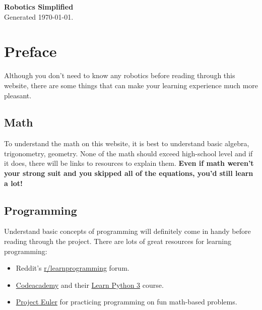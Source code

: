\documentclass[12pt,twoside]{article}
\begin{document}

\sloppy

\begin{titlepage}
	\begin{center}
    \vspace*{2cm}
		\Huge \textbf{Robotics Simplified}\\
		\normalsize \vspace{0.5cm}
		Generated \today.
	\end{center}
\end{titlepage}

\cleardoublepage

\setcounter{page}{1}%

\tableofcontents

\cleardoublepage


\section{Preface}


Although you don't need to know any robotics before reading through this website, there are some things that can make your learning experience much more pleasant.


\subsection{Math}
To understand the math on this website, it is best to understand basic algebra, trigonometry, geometry. None of the math should exceed high-school level and if it does, there will be links to resources to explain them. \textbf{Even if math weren't your strong suit and you skipped all of the equations, you'd still learn a lot!}


\subsection{Programming}
Understand basic concepts of programming will definitely come in handy before reading through the project. There are lots of great resources for learning programming:
\begin{itemize}
\item Reddit's \href{https://www.reddit.com/r/learnprogramming/}{r/learnprogramming} forum.
\item \href{https://www.codecademy.com/}{Codeacademy} and their \href{https://www.codecademy.com/learn/learn-python-3}{Learn Python 3} course.
\item \href{https://projecteuler.net/}{Project Euler} for practicing programming on fun math-based problems.
\end{itemize}\vspace{\parskip}
\end{document}
